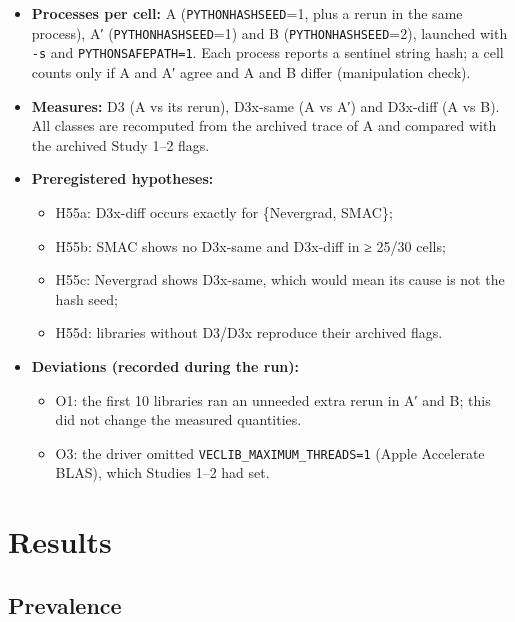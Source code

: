 \documentclass[acmsmall,screen,review,anonymous=false]{acmart}
\providecommand{\tightlist}{\setlength{\itemsep}{0pt}\setlength{\parskip}{0pt}}
\begin{document}
\begin{itemize}
\tightlist
\item
  \textbf{Processes per cell:} A (\texttt{PYTHONHASHSEED}=1, plus a rerun in the same process), A′ (\texttt{PYTHONHASHSEED}=1) and B
  (\texttt{PYTHONHASHSEED}=2), launched with \texttt{-s} and \texttt{PYTHONSAFEPATH=1}. Each process reports a sentinel string hash;
  a cell counts only if A and A′ agree and A and B differ (manipulation check).
\item
  \textbf{Measures:} D3 (A vs its rerun), D3x-same (A vs A′) and D3x-diff (A vs B). All classes are recomputed from the
  archived trace of A and compared with the archived Study 1--2 flags.
\item
  \textbf{Preregistered hypotheses:}

  \begin{itemize}
  \tightlist
  \item
    H55a: D3x-diff occurs exactly for \{Nevergrad, SMAC\};
  \item
    H55b: SMAC shows no D3x-same and D3x-diff in ≥ 25/30 cells;
  \item
    H55c: Nevergrad shows D3x-same, which would mean its cause is not the hash seed;
  \item
    H55d: libraries without D3/D3x reproduce their archived flags.
  \end{itemize}
\item
  \textbf{Deviations (recorded during the run):}

  \begin{itemize}
  \tightlist
  \item
    O1: the first 10 libraries ran an unneeded extra rerun in A′ and B; this did not change the measured quantities.
  \item
    O3: the driver omitted \texttt{VECLIB\_\allowbreak{}MAXIMUM\_\allowbreak{}THREADS=1} (Apple Accelerate BLAS), which Studies 1--2 had set.
  \end{itemize}
\end{itemize}

\section{Results}\label{results}

\subsection{Prevalence}\label{prevalence}
\end{document}
